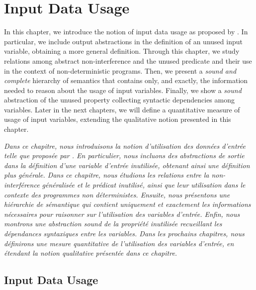 \setchapterpreamble[u]{\margintoc}


\chapter{Input Data Usage}


In this chapter, we introduce the notion of input data usage as proposed by \textcite{Urban2018}.
In particular, we include output abstractions in the definition of an unused input variable, obtaining a more general definition.
Through this chapter, we study relations among abstract non-interference and the unused predicate and their use in the context of non-deterministic programs.
Then, we present a \emph{sound and complete} hierarchy of semantics that contains only, and exactly, the information needed to reason about the usage of input variables.
Finally, we show a \emph{sound} abstraction of the unused property collecting syntactic dependencies among variables.
Later in the next chapters, we will define a quantitative measure of usage of input variables, extending the qualitative notion presented in this chapter.


\frenchdiv

\emph{Dans ce chapitre, nous introduisons la notion d'utilisation des données d'entrée telle que proposée par .
En particulier, nous incluons des abstractions de sortie dans la définition d'une variable d'entrée inutilisée, obtenant ainsi une définition plus générale.
Dans ce chapitre, nous étudions les relations entre la non-interférence généralisée et le prédicat inutilisé, ainsi que leur utilisation dans le contexte des programmes non déterministes.
Ensuite, nous présentons une hiérarchie de sémantique qui contient uniquement et exactement les informations nécessaires pour raisonner sur l'utilisation des variables d'entrée.
Enfin, nous montrons une abstraction \emph{sound} de la propriété inutilisée recueillant les dépendances syntaxiques entre les variables.
Dans les prochains chapitres, nous définirons une mesure quantitative de l'utilisation des variables d'entrée, en étendant la notion qualitative présentée dans ce chapitre.}

\section{Input Data Usage}

